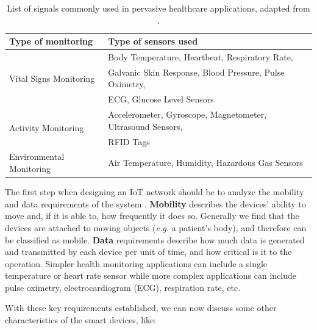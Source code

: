 \begin{table}[H]
    \centering
    \begin{tabular}{l|l}
        \textbf{Type of monitoring} & \textbf{Type of sensors used} \\ 
        \hline
        \multirow{3}{*}{Vital Signs Monitoring} & Body Temperature, Heartbeat, Respiratory Rate, \\ & Galvanic Skin Response, Blood Pressure, Pulse Oximetry, \\ & \acf{ECG}, Glucose Level Sensors \\ \hline
        \multirow{2}{*}{Activity Monitoring} & Accelerometer, Gyroscope, Magnetometer, Ultrasound Sensors,\\ & \acf{RFID} Tags\\
        \hline
        \multirow{1}{*}{Environmental Monitoring} & Air Temperature, Humidity, Hazardous Gas Sensors \\
    \end{tabular}
    \caption[List of signals commonly measured in pervasive healthcare applications]{List of signals commonly used in pervasive healthcare applications, adapted from \cite{MinhDang2019}.}
    \label{tab:layer1-sensors}
\end{table}


The first step when designing an IoT network should be to analyze the mobility and data requirements of the system \cite{10.5555/3161403}. \textbf{Mobility} describes the devices' ability to move and, if it is able to, how frequently it does so. Generally we find that the devices are attached to moving objects (\textit{e.g.} a patient's body), and therefore can be classified as mobile. \textbf{Data} requirements describe how much data is generated and transmitted by each device per unit of time, and how critical is it to the operation. Simpler health monitoring applications can include a single temperature or heart rate sensor while more complex applications can include pulse oximetry, electrocardiogram (\acs{ECG}), respiration rate, etc. \bigskip

With these key requirements established, we can now discuss some other characteristics of the smart devices, like:

